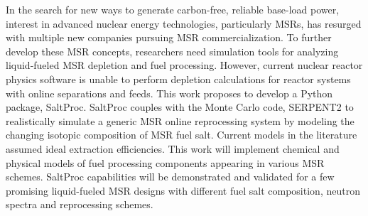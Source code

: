 In the search for new ways to generate carbon-free, reliable 
base-load power, interest in advanced nuclear energy technologies, 
particularly \glspl{MSR}, has resurged with multiple new companies 
pursuing \gls{MSR} commercialization. To further develop these \gls{MSR} 
concepts, researchers need simulation tools for analyzing liquid-fueled 
\gls{MSR} depletion and fuel processing. However, current nuclear reactor 
physics software is unable to perform depletion calculations for 
reactor systems with online separations and feeds. This work proposes to 
develop a Python package, SaltProc. SaltProc couples 
with the Monte Carlo code, SERPENT2 to realistically simulate a generic 
\gls{MSR} online reprocessing system by modeling the changing isotopic 
composition of \gls{MSR} fuel salt. Current models in the literature 
assumed ideal extraction efficiencies. This work will implement chemical 
and physical models of fuel processing components appearing in various 
\gls{MSR} schemes. 
SaltProc capabilities will be demonstrated and validated for a few 
promising liquid-fueled \gls{MSR} designs with different fuel salt 
composition, neutron spectra and reprocessing schemes.